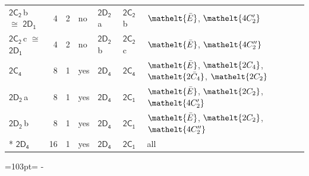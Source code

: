 \documentclass[10pt,a4paper]{article}
\newcommand{\needspace}[1]{\par\penalty-100\begingroup\dimen0=#1\relax\dimen2=\pagegoal
  \advance\dimen2-\pagetotal\ifdim\dimen0>\dimen2\relax\ifdim\dimen2>0pt\vfil\break\fi\fi
  \endgroup}
\numberwithin{equation}{section}
\newcommand{\eltfont}[1]{{\let\sigma\eltsigma\mathelt{#1}}}
\newcommand{\grp}[1]{\mathsf{#1}}
\newcommand{\cls}[1]{\eltfont{#1}}
\newcommand{\samecls}{\cong}
\newcommand{\clsletter}[1]{\,{\scriptsize\color{black!55}#1}}
\newcommand{\barred}[1]{\bar{#1}}
\newlength{\fillwidth}\newlength{\cellwidth}\newlength{\colwidth}
\begin{document}
{\begin{longtable}{@{}lrrlll>{\RaggedRight\arraybackslash}p{\fillwidth}@{}}
\href{2C2.pdf}{$\grp{2C_{2}}$}\clsletter{b} $\samecls$ \href{2D1.pdf}{$\grp{2D_{1}}$} & 4 & 2 & no & \href{2D2.pdf}{$\grp{2D_{2}}$}\clsletter{a} & \href{2C2.pdf}{$\grp{2C_{2}}$}\clsletter{b} & $\cls{\barred{E}}$, $\cls{4C_{2}'}$\\
\href{2C2.pdf}{$\grp{2C_{2}}$}\clsletter{c} $\samecls$ \href{2D1.pdf}{$\grp{2D_{1}}$} & 4 & 2 & no & \href{2D2.pdf}{$\grp{2D_{2}}$}\clsletter{b} & \href{2C2.pdf}{$\grp{2C_{2}}$}\clsletter{c} & $\cls{\barred{E}}$, $\cls{4C_{2}''}$\\
\href{2C4.pdf}{$\grp{2C_{4}}$} & 8 & 1 & yes & \href{2D4.pdf}{$\grp{2D_{4}}$} & \href{2C4.pdf}{$\grp{2C_{4}}$} & $\cls{\barred{E}}$, $\cls{2C_{4}}$, $\cls{2\barred{C}_{4}}$, $\cls{2C_{2}}$\\
\href{2D2.pdf}{$\grp{2D_{2}}$}\clsletter{a} & 8 & 1 & yes & \href{2D4.pdf}{$\grp{2D_{4}}$} & \href{2C1.pdf}{$\grp{2C_{1}}$} & $\cls{\barred{E}}$, $\cls{2C_{2}}$, $\cls{4C_{2}'}$\\
\href{2D2.pdf}{$\grp{2D_{2}}$}\clsletter{b} & 8 & 1 & yes & \href{2D4.pdf}{$\grp{2D_{4}}$} & \href{2C1.pdf}{$\grp{2C_{1}}$} & $\cls{\barred{E}}$, $\cls{2C_{2}}$, $\cls{4C_{2}''}$\\*
\href{2D4.pdf}{$\grp{2D_{4}}$} & 16 & 1 & yes & \href{2D4.pdf}{$\grp{2D_{4}}$} & \href{2C1.pdf}{$\grp{2C_{1}}$} & all\\
\bottomrule\end{longtable}}
\needspace{103pt}
\end{document}
